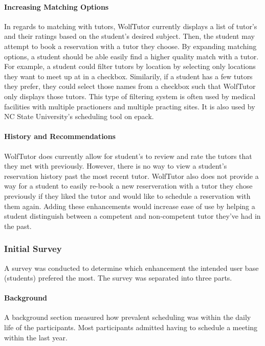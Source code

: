 \paragraph{Increasing Matching Options} In regards to matching with tutors,
WolfTutor currently displays a list of tutor's and their ratings based on the
student's desired subject. Then, the student may attempt to book a reservation
with a tutor they choose. By expanding matching options, a student should be
able easily find a higher quality match with a tutor. For example, a student
could filter tutors by location by selecting only locations they want to meet up
at in a checkbox. Similarily, if a student has a few tutors they prefer, they
could select those names from a checkbox such that WolfTutor only displays those
tutors. This type of filtering system is often used by medical facilities with
multiple practioners and multiple practing sites. It is also used by NC State
University's scheduling tool on epack.

\paragraph{History and Recommendations} WolfTutor does currently allow
for student's to review and rate the tutors that they met with
previously. However, there is no way to view a student's reservation
history past the most recent tutor. WolfTutor also does not provide a
way for a student to easily re-book a new reserveration with a tutor
they chose previously if they liked the tutor and would like to
schedule a reservation with them again. Adding these enhancements
would increase ease of use by helping a student distinguish between a
competent and non-competent tutor they've had in the past.


\subsubsection{Initial Survey}
\label{sec:initial-survey} A survey was conducted to determine which enhancement
the intended user base (students) prefered the most. The survey was separated
into three parts.

\paragraph{Background} A background section measured how prevalent scheduling
was within the daily life of the participants. Most participants admitted having
to schedule a meeting within the last year.

